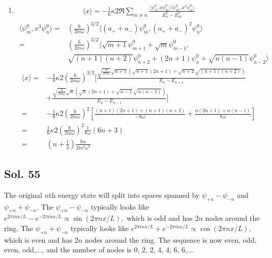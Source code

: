 \begin{enumerate}
    \item 
    \begin{align*}
        \langle x\rangle
        =-\frac{1}{6}\kappa 
        2\Re 
        \sum_{m\neq n}
        \frac{\langle
        \psi_n^0, x\psi_m^0
        \rangle
        \langle
        \psi_m^0, x^3\psi_n^0
        \rangle}{E_n^0 - E_m^0}
    \end{align*}
    \begin{align*}
        \langle
        \psi_m^0, x^3\psi_n^0
        \rangle=&
        \left(
        \frac{\hbar}{2m\omega}
        \right)^{3/2}
        \langle
        (a_+ + a_-)
        \psi_m^0, 
        (a_+ + a_-)^2
        \psi_n^0
        \rangle\\
        =&
        \left(
        \frac{\hbar}{2m\omega}
        \right)^{3/2}
        \langle
        \sqrt{m+1}\psi_{m+1}^0 + 
        \sqrt{m}\psi_{m-1}^0,\\
        &
        \sqrt{(n+1)(n+2)}\psi_{n+2}^0
        +
        (2n+1)\psi_{n}^0
        +   
        \sqrt{n(n-1)}\psi_{n-2}^0
        \rangle
    \end{align*}
    \begin{align*}
        \langle x\rangle
        =&-\frac{1}{6}\kappa 
        2
        \left(
        \frac{\hbar}{2m\omega}
        \right)^{3/2}
        \bigg[
        \frac{\sqrt{\frac{\hbar}{2m\omega}}\sqrt{n+1}
        (\sqrt{n+1}(2n+1) + \sqrt{n+2}\sqrt{(n+1)(n+2)})
        }{E_{n}-E_{n+1}}\\
        &+
        \frac{\sqrt{\frac{\hbar}{2m\omega}}\sqrt{n}
        (\sqrt{n}(2n+1) + \sqrt{n-1}\sqrt{n(n-1)})
        }{E_{n}-E_{n-1}}
        \bigg]\\
        =&
        -\frac{1}{6}\kappa 
        2
        \left(
        \frac{\hbar}{2m\omega}
        \right)^2
        \left[
        \frac{(n+1)(2n+1) + (n+1)(n+2)
        }{-\hbar\omega}
        +
        \frac{
        n(2n+1)+n(n-1)
        }{\hbar\omega}
        \right]\\
        =&
         \frac{1}{6}\kappa 
        2
        \left(
        \frac{\hbar}{2m\omega}
        \right)^2
        \frac{1}{\hbar\omega}(6n+3)\\
        =&(n+\frac{1}{2})\frac{\hbar\kappa}{2m^2\omega^3}
    \end{align*}
    
\end{enumerate}

\subsection*{Sol. 55}
The original $n$th energy state will split into spaces spanned by $\psi_{+n}-\psi_{-n}$ and $\psi_{+n}+\psi_{-n}.$ 
The $\psi_{+n}-\psi_{-n}$ typically looks like 
$e^{2\pi inx/L}-e^{-2\pi inx/L}\propto
\sin(2\pi nx/L),$ which is odd and has $2n$ nodes around the ring.
The $\psi_{+n}+\psi_{-n}$ typically looks like 
$e^{2\pi inx/L}+e^{-2\pi inx/L}\propto
\cos(2\pi nx/L),$ which is even and has $2n$ nodes around the ring.
The sequence is now even, odd, even, odd,..., and the number of nodes is 0, 2, 2, 4, 4, 6, 6,...

